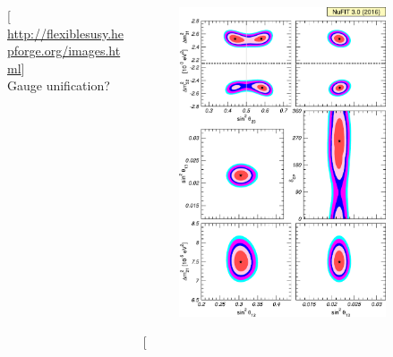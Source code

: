 \documentclass[10pt,aspectratio=169]{beamer}
\begin{document}
\begin{frame}
\begin{columns}[t]
\begin{column}{0.3\textwidth}
      \begin{center}
        {\tiny [\href{http://flexiblesusy.hepforge.org/images.html}{%
        http://flexiblesusy.hepforge.org/images.html}]} \\
        Gauge unification?
      \end{center}
    \end{column}
    \begin{column}{0.7\textwidth}
      \begin{columns}[t]
        \begin{column}{0.5\textwidth}
          \vspace*{-30pt}
          \begin{figure}
            \includegraphics[width=0.85\textwidth]{neutrino_masses} \\
          \end{figure}
          \vspace*{-25pt}
          \begin{center}
            {\tiny [\href{https://arxiv.org/abs/1611.01514}{%
}}
\end{center}
\end{column}
\end{columns}
\end{column}
\end{columns}
\end{frame}
\end{document}
